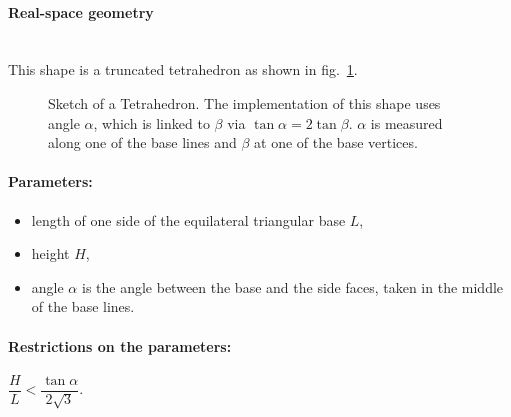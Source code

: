 \paragraph{Real-space geometry}\mbox{}\\
This shape is a truncated tetrahedron as shown in fig.~\ref{fig:tetrahedron}.

\begin{figure}[ht]
\hfill
{}
\hfill
{}
\hfill
\caption{Sketch of a Tetrahedron. The implementation of this shape uses angle
  $\alpha$, which is linked to $\beta$ via $\tan \alpha = 2 \tan 
  \beta$. $\alpha$ is measured along one of the base lines and $\beta$
  at one of the base vertices.}
\label{fig:tetrahedron}
\end{figure}

\FloatBarrier

\paragraph{Parameters:}
\begin{itemize}
\item length of one side of the equilateral triangular base $L$,
\item height $H$,
\item angle $\alpha$ is the angle between the base and the
  side faces, taken in the middle of the base lines.
\end{itemize}

\paragraph{Restrictions on the parameters:} 
$\dfrac{H}{L}< \dfrac{\tan{\alpha}}{2\sqrt{3}}$.

